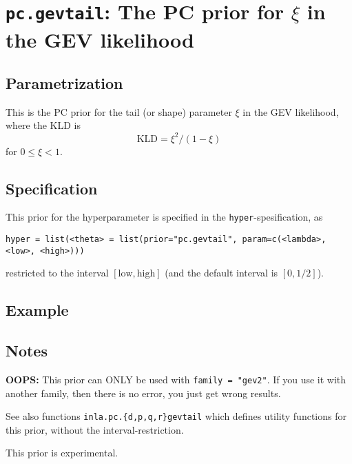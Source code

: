 \documentclass[a4paper,11pt]{article}
\begin{document}
\section*{\texttt{pc.gevtail}: The PC prior for $\xi$ in the GEV likelihood}

\subsection*{Parametrization}

This is the PC prior for the tail (or shape) parameter $\xi$ in the
GEV likelihood, where the KLD is
\begin{displaymath}
    \text{KLD} = \xi^{2}/(1-\xi)
\end{displaymath}
for $0 \le \xi < 1$.

\subsection*{Specification}
This prior for the hyperparameter is specified in the
\texttt{hyper}-spesification, as
\begin{center}
    \texttt{hyper = list(<theta> = list(prior="pc.gevtail", param=c(<lambda>, <low>, <high>)))}
\end{center}
restricted to the interval $[\text{low}, \text{high}]$ (and the
default interval is $[0,1/2]$).

\subsection*{Example}

\subsection*{Notes}

\textbf{OOPS:} This prior can ONLY be used with \texttt{family =
    "gev2"}. If you use it with another family, then there is no
error, you just get wrong results. 

See also functions \texttt{inla.pc.\{d,p,q,r\}gevtail} which defines
utility functions for this prior, without the interval-restriction.

This prior is experimental.
\end{document}
